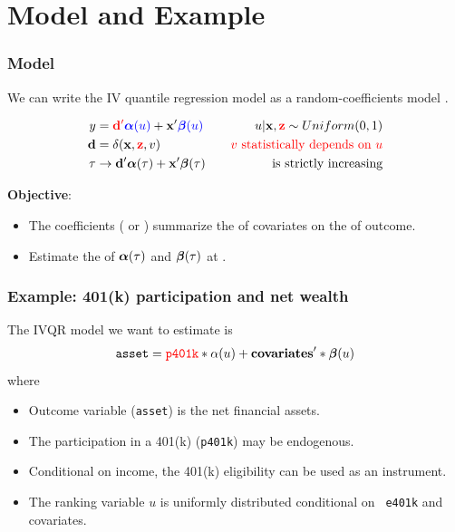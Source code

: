 \documentclass[11pt]{beamer}
\begin{document}
\section{Model and Example}
\begin{frame}
  \frametitle{Model}
We can write the IV quantile regression model as a random-coefficients model
\citep{chernozhukov2008}.

\begin{align}
  y &= {\color{red}{\mathbf{d}'}} {\color{blue}{\boldsymbol{\alpha}(u)}} + \mathbf{x}' {\color{blue}{\boldsymbol{\beta}(u)}} &\quad u|\mathbf{x},
  {\color{red}{\mathbf{z}}} \sim
  Uniform(0,1) \\
  \mathbf{d} & = \delta(\mathbf{x}, {\color{red}{\mathbf{z}}}, v) &\quad {\color{red}{v \text{ statistically
  depends on } u}}\\
 \tau &\rightarrow \mathbf{d}' \boldsymbol{\alpha}(\tau) + \mathbf{x}' \boldsymbol{\beta}(\tau) &\quad \text{ is
   strictly increasing}
\end{align}

{\bf Objective}:
\begin{itemize}
    \setlength\itemsep{1em}
    \item The coefficients (\myblue{$\alphab(\tau)$} or \myblue{$\betab(\tau)$})
      summarize the  of covariates on the
       of outcome.

  \item Estimate the  of $\alphab(\tau)$ and $\betab(\tau)$ at
    .
\end{itemize}
\end{frame}


\begin{frame}
  \frametitle{Example: 401(k) participation and net wealth}

The IVQR model we want to estimate is
\begin{align*}
  {\tt asset} = {\color{red}{{\tt p401k}}} * \alpha(u) +  {\bf covariates}' *
  \boldsymbol{\beta}(u) \\
\end{align*}
where
\begin{itemize}
  \item Outcome variable ({\tt asset}) is the net financial assets.
  \item The participation in a 401(k) ({\tt p401k}) may be endogenous.
  \item Conditional on income, the 401(k) eligibility can be used as an
    instrument.
  \item The ranking variable $u$ is uniformly distributed conditional on {\tt
    e401k} and covariates.
\end{itemize}
\end{frame}
\end{document}
